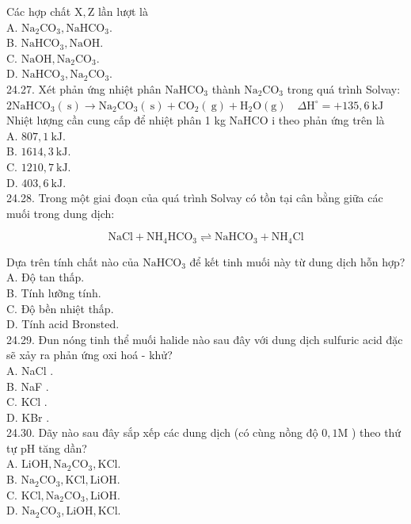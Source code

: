\documentclass[10pt]{article}
\begin{document}
Các hợp chất $\mathrm{X}, \mathrm{Z}$ lần lượt là\\
A. $\mathrm{Na}_{2} \mathrm{CO}_{3}, \mathrm{NaHCO}_{3}$.\\
B. $\mathrm{NaHCO}_{3}, \mathrm{NaOH}$.\\
C. $\mathrm{NaOH}, \mathrm{Na}_{2} \mathrm{CO}_{3}$.\\
D. $\mathrm{NaHCO}_{3}, \mathrm{Na}_{2} \mathrm{CO}_{3}$.\\
24.27. Xét phản ứng nhiệt phân $\mathrm{NaHCO}_{3}$ thành $\mathrm{Na}_{2} \mathrm{CO}_{3}$ trong quá trình Solvay: $2 \mathrm{NaHCO}_{3}(\mathrm{~s}) \longrightarrow \mathrm{Na}_{2} \mathrm{CO}_{3}(\mathrm{~s})+\mathrm{CO}_{2}(\mathrm{~g})+\mathrm{H}_{2} \mathrm{O}(\mathrm{g}) \quad \Delta \mathrm{H}^{\circ}=+135,6 \mathrm{~kJ}$ Nhiệt lượng cần cung cấp để nhiệt phân 1 kg NaHCO i theo phản ứng trên là\\
A. $807,1 \mathrm{~kJ}$.\\
B. $1614,3 \mathrm{~kJ}$.\\
C. $1210,7 \mathrm{~kJ}$.\\
D. $403,6 \mathrm{~kJ}$.\\
24.28. Trong một giai đoạn của quá trình Solvay có tồn tại cân bằng giữa các muối trong dung dịch:

$$
\mathrm{NaCl}+\mathrm{NH}_{4} \mathrm{HCO}_{3} \rightleftharpoons \mathrm{NaHCO}_{3}+\mathrm{NH}_{4} \mathrm{Cl}
$$

Dựa trên tính chất nào của $\mathrm{NaHCO}_{3}$ để kết tinh muối này từ dung dịch hỗn hợp?\\
A. Độ tan thấp.\\
B. Tính lưỡng tính.\\
C. Độ bền nhiệt thấp.\\
D. Tính acid Bronsted.\\
24.29. Đun nóng tinh thể muối halide nào sau đây với dung dịch sulfuric acid đặc sẽ xảy ra phản ứng oxi hoá - khử?\\
A. NaCl .\\
B. NaF .\\
C. KCl .\\
D. KBr .\\
24.30. Dãy nào sau đây sắp xếp các dung dịch (có cùng nồng độ $0,1 \mathrm{M}$ ) theo thứ tự pH tăng dần?\\
A. $\mathrm{LiOH}, \mathrm{Na}_{2} \mathrm{CO}_{3}, \mathrm{KCl}$.\\
B. $\mathrm{Na}_{2} \mathrm{CO}_{3}, \mathrm{KCl}, \mathrm{LiOH}$.\\
C. $\mathrm{KCl}, \mathrm{Na}_{2} \mathrm{CO}_{3}, \mathrm{LiOH}$.\\
D. $\mathrm{Na}_{2} \mathrm{CO}_{3}, \mathrm{LiOH}, \mathrm{KCl}$.
\end{document}
